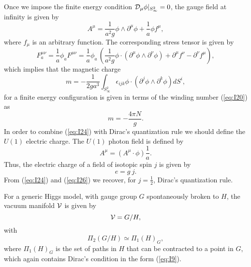 Once we impose the finite energy condition ${\cal D}_{\mu} \phi
|_{S_{\infty}^2}=0$, the gauge field at infinity is given by 
\begin{equation}
A^{\mu}= \frac {1}{a^{2}g} \phi \wedge \partial^{\mu} \phi
+ \frac {1}{a} \phi f^{\mu},
\label{eq:I21}
\end{equation}
where $f_{\mu}$ is an arbitrary function. The corresponding stress
tensor is given by
\begin{equation}
F_{a}^{\mu \nu}= \frac {1}{a} \phi_{a} F^{\mu \nu}=
\frac {1}{a} \phi_{a} \, \left( \frac {1}{a^{2}g} \phi \cdot (\partial^{\mu} \phi
\wedge \partial^{\nu} \phi) + \partial^{\mu}f^{\nu}-
\partial^{\nu}f^{\mu} \right),
\label{eq:I22}
\end{equation}
which implies that the magnetic charge
\begin{equation}
m = - \frac {1}{2ga^{3}} \int_{S_{\infty}^2}
\epsilon_{ijk} \phi \cdot (\partial^{j} \phi \wedge \partial^{k}
\phi) d S^{i},
\label{eq:I23}
\end{equation}
for a finite energy configuration is given in terms of the
winding number (\ref{eq:I20}) as \cite{tp}
\begin{equation}
m= - \frac {4 \pi N}{g}.
\label{eq:I24}
\end{equation}
In order to combine (\ref{eq:I24}) with Dirac's quantization rule
we should define the $U(1)$ electric charge. The $U(1)$ photon
field is defined by 
\begin{equation}
A^{\mu} = ( A^{\mu} \cdot \phi ) \frac {1}{a}.
\label{eq:I25}
\end{equation}
Thus, the electric charge of a field of isotopic spin $j$ is
given by
\begin{equation}
e= g \: j.
\label{eq:I26}
\end{equation}
From (\ref{eq:I24}) and (\ref{eq:I26}) we recover, for $j= \frac
{1}{2}$, Dirac's quantization rule.
  
For a generic Higgs model, with gauge group $G$ spontaneously
broken to $H$, the vacuum manifold ${\cal V}$ is given by 
\begin{equation}
{\cal V} = G/H,
\label{eq:I27}
\end{equation}
with
\begin{equation}
\Pi_2(G/H) \simeq \Pi_1(H)_G,
\label{eq:I28}
\end{equation}
where $\Pi_1(H)_G$ is the set of paths in $H$ that can be
contracted to a point in $G$, which again contains Dirac's
condition in the form (\ref{eq:I9}).
  
